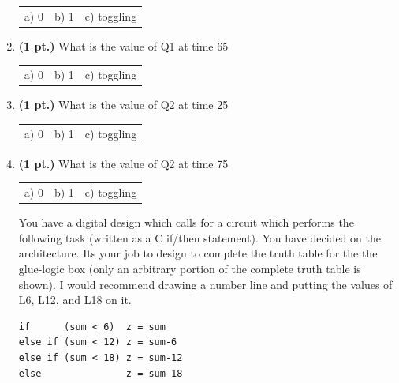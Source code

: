 \documentclass{article}
\begin{document}
\begin{enumerate}
\begin{tabular}{p{0.75in}p{0.75in}p{1.75in}}
a) 0 & b) 1 & c) toggling \\
\end{tabular}

\item {\bf (1 pt.)} What is the value of Q1 at time 65

\begin{tabular}{p{0.75in}p{0.75in}p{1.75in}}
a) 0 & b) 1 & c) toggling \\
\end{tabular}

\item {\bf (1 pt.)} What is the value of Q2 at time 25

\begin{tabular}{p{0.75in}p{0.75in}p{1.75in}}
a) 0 & b) 1 & c) toggling \\
\end{tabular}

\item {\bf (1 pt.)} What is the value of Q2 at time 75

\begin{tabular}{p{0.75in}p{0.75in}p{1.75in}}
a) 0 & b) 1 & c) toggling \\
\end{tabular}

\pagebreak
You have a digital design which calls for a circuit which performs the 
following task (written as a C if/then statement).  You have decided on 
the architecture.  Its your job to design to complete the truth table
for the the glue-logic box (only an arbitrary portion of the complete 
truth table is shown).  I would recommend drawing a number line 
and putting the values of L6, L12, and L18 on it.  

\begin{verbatim}
if      (sum < 6)  z = sum
else if (sum < 12) z = sum-6
else if (sum < 18) z = sum-12
else               z = sum-18
\end{verbatim}


\end{enumerate}
\end{document}
